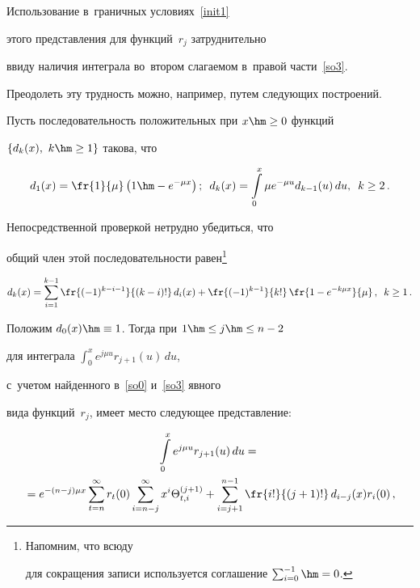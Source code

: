 Использование в~граничных условиях~\eqref{init1}

этого представления для функций~$r_j$ затруднительно

ввиду наличия интеграла во~втором слагаемом в~правой части~\eqref{so3}.

Преодолеть эту трудность можно, например, путем следующих построений.

Пусть последовательность положительных при $x \hm\ge 0$ функций

$\{d_k(x),\ k \hm\ge 1\}$ такова, что

$$

d_1(x)=\fr{1}{\mu}\left(1\hm-e^{- \mu x}\right);\enskip

d_{k}(x)=\int\limits_0^x \mu e^{-\mu u} d_{k-1}(u)\,du,\enskip k\ge 2\,.

$$

%

Непосредственной проверкой нетрудно убедиться, что

общий член этой последовательности равен\footnote{Напомним, что всюду

для сокращения записи используется соглашение $\sum\nolimits_{i=0}^{-1}\hm=0$.}

\begin{equation*}

d_k(x)=

\sum\limits_{i=1}^{k-1} \fr{(-1)^{k-i-1}}{(k-i)!}\, d_i(x)+

\fr{(-1)^{k-1}}{k!} \,\fr{1-e^{- k \mu x}}{\mu}\,, \enskip k \ge 1\,.

\end{equation*}

Положим $d_0(x) \hm\equiv 1$. Тогда при $1\hm\le j \hm\le n-2$

для интеграла $\int\nolimits_0^x e^{j\mu u} r_{j+1}(u)\, du$,

с~учетом найденного в~\eqref{so0} и~\eqref{so3} явного

вида функций~$r_j$, имеет место сле\-ду\-ющее представление:

\begin{multline}

\int\limits_0^x e^{j \mu u} r_{j+1}(u)\, du

={}\\

{}= e^{- (n-j)\mu x} \sum\limits_{t=n}^{\infty}

r_{t}(0) \sum\limits_{i=n-j}^\infty x^i \Theta^{(j+1)}_{t,i}+

 \sum\limits _{i=j+1}^{n-1} \fr{i!}{(j+1)!}\, d_{i-j}(x) r_i(0)\,,

\label{so4}

\end{multline}

